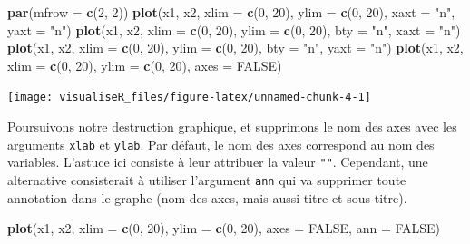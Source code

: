 \documentclass[]{article}
\newenvironment{Shaded}{\begin{snugshade}}{\end{snugshade}}
\newcommand{\DataTypeTok}[1]{\textcolor[rgb]{0.13,0.29,0.53}{#1}}
\newcommand{\DecValTok}[1]{\textcolor[rgb]{0.00,0.00,0.81}{#1}}
\newcommand{\KeywordTok}[1]{\textcolor[rgb]{0.13,0.29,0.53}{\textbf{#1}}}
\newcommand{\NormalTok}[1]{#1}
\newcommand{\OtherTok}[1]{\textcolor[rgb]{0.56,0.35,0.01}{#1}}
\newcommand{\StringTok}[1]{\textcolor[rgb]{0.31,0.60,0.02}{#1}}
\begin{document}
\begin{Shaded}
\begin{Highlighting}[]
\KeywordTok{par}\NormalTok{(}\DataTypeTok{mfrow =} \KeywordTok{c}\NormalTok{(}\DecValTok{2}\NormalTok{, }\DecValTok{2}\NormalTok{))}
\KeywordTok{plot}\NormalTok{(x1, x2, }\DataTypeTok{xlim =} \KeywordTok{c}\NormalTok{(}\DecValTok{0}\NormalTok{, }\DecValTok{20}\NormalTok{), }\DataTypeTok{ylim =} \KeywordTok{c}\NormalTok{(}\DecValTok{0}\NormalTok{, }\DecValTok{20}\NormalTok{), }\DataTypeTok{xaxt =} \StringTok{"n"}\NormalTok{, }\DataTypeTok{yaxt =} \StringTok{"n"}\NormalTok{)}
\KeywordTok{plot}\NormalTok{(x1, x2, }\DataTypeTok{xlim =} \KeywordTok{c}\NormalTok{(}\DecValTok{0}\NormalTok{, }\DecValTok{20}\NormalTok{), }\DataTypeTok{ylim =} \KeywordTok{c}\NormalTok{(}\DecValTok{0}\NormalTok{, }\DecValTok{20}\NormalTok{), }\DataTypeTok{bty =} \StringTok{"n"}\NormalTok{, }\DataTypeTok{xaxt =} \StringTok{"n"}\NormalTok{)}
\KeywordTok{plot}\NormalTok{(x1, x2, }\DataTypeTok{xlim =} \KeywordTok{c}\NormalTok{(}\DecValTok{0}\NormalTok{, }\DecValTok{20}\NormalTok{), }\DataTypeTok{ylim =} \KeywordTok{c}\NormalTok{(}\DecValTok{0}\NormalTok{, }\DecValTok{20}\NormalTok{), }\DataTypeTok{bty =} \StringTok{"n"}\NormalTok{, }\DataTypeTok{yaxt =} \StringTok{"n"}\NormalTok{)}
\KeywordTok{plot}\NormalTok{(x1, x2, }\DataTypeTok{xlim =} \KeywordTok{c}\NormalTok{(}\DecValTok{0}\NormalTok{, }\DecValTok{20}\NormalTok{), }\DataTypeTok{ylim =} \KeywordTok{c}\NormalTok{(}\DecValTok{0}\NormalTok{, }\DecValTok{20}\NormalTok{), }\DataTypeTok{axes =} \OtherTok{FALSE}\NormalTok{)}
\end{Highlighting}
\end{Shaded}

\begin{center}\texttt{[image: visualiseR\_files/figure-latex/unnamed-chunk-4-1]} \end{center}

Poursuivons notre destruction graphique, et supprimons le nom des axes avec les arguments \texttt{xlab} et \texttt{ylab}. Par défaut, le nom des axes correspond au nom des variables. L'astuce ici consiste à leur attribuer la valeur \texttt{""}. Cependant, une alternative consisterait à utiliser l'argument \texttt{ann} qui va supprimer toute annotation dans le graphe (nom des axes, mais aussi titre et sous-titre).

\begin{Shaded}
\begin{Highlighting}[]
\KeywordTok{plot}\NormalTok{(x1, x2, }\DataTypeTok{xlim =} \KeywordTok{c}\NormalTok{(}\DecValTok{0}\NormalTok{, }\DecValTok{20}\NormalTok{), }\DataTypeTok{ylim =} \KeywordTok{c}\NormalTok{(}\DecValTok{0}\NormalTok{, }\DecValTok{20}\NormalTok{), }\DataTypeTok{axes =} \OtherTok{FALSE}\NormalTok{, }\DataTypeTok{ann =} \OtherTok{FALSE}\NormalTok{)}
\end{Highlighting}
\end{Shaded}
\end{document}
